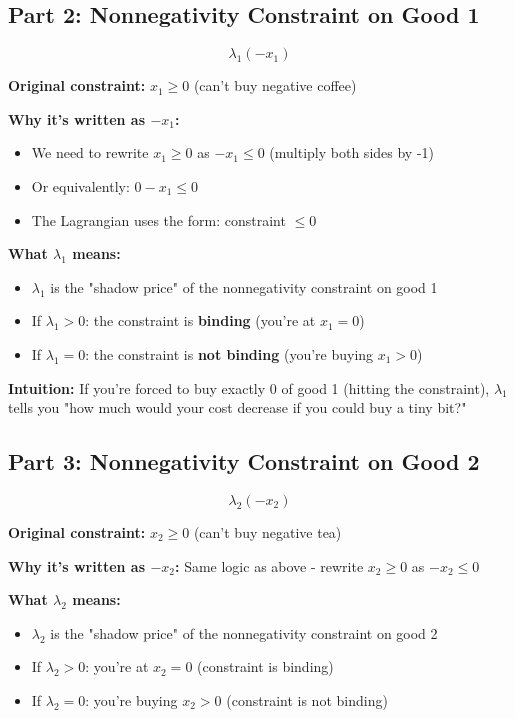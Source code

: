 \documentclass[11pt]{article}
\begin{document}
\subsection{Part 2: Nonnegativity Constraint on Good 1}

\begin{equation}
\boxed{\lambda_1(-x_1)}
\end{equation}

\textbf{Original constraint:} $x_1 \geq 0$ (can't buy negative coffee)

\textbf{Why it's written as $-x_1$:}
\begin{itemize}
\item We need to rewrite $x_1 \geq 0$ as $-x_1 \leq 0$ (multiply both sides by -1)
\item Or equivalently: $0 - x_1 \leq 0$
\item The Lagrangian uses the form: constraint $\leq 0$
\end{itemize}

\textbf{What $\lambda_1$ means:}
\begin{itemize}
\item $\lambda_1$ is the "shadow price" of the nonnegativity constraint on good 1
\item If $\lambda_1 > 0$: the constraint is \textbf{binding} (you're at $x_1 = 0$)
\item If $\lambda_1 = 0$: the constraint is \textbf{not binding} (you're buying $x_1 > 0$)
\end{itemize}

\textbf{Intuition:} If you're forced to buy exactly 0 of good 1 (hitting the constraint), $\lambda_1$ tells you "how much would your cost decrease if you could buy a tiny bit?"

\subsection{Part 3: Nonnegativity Constraint on Good 2}

\begin{equation}
\boxed{\lambda_2(-x_2)}
\end{equation}

\textbf{Original constraint:} $x_2 \geq 0$ (can't buy negative tea)

\textbf{Why it's written as $-x_2$:} Same logic as above - rewrite $x_2 \geq 0$ as $-x_2 \leq 0$

\textbf{What $\lambda_2$ means:}
\begin{itemize}
\item $\lambda_2$ is the "shadow price" of the nonnegativity constraint on good 2
\item If $\lambda_2 > 0$: you're at $x_2 = 0$ (constraint is binding)
\item If $\lambda_2 = 0$: you're buying $x_2 > 0$ (constraint is not binding)
\end{itemize}
\end{document}
